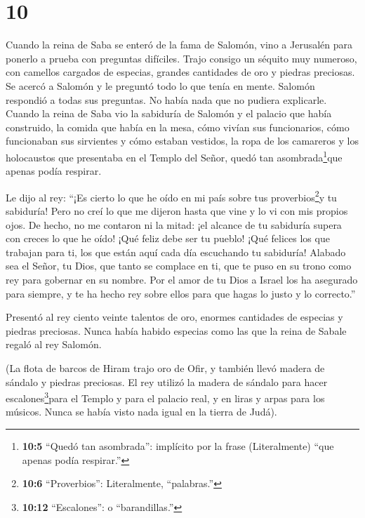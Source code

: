 \hypertarget{section-9}{%
\section{10}\label{section-9}}

 Cuando la reina de Saba se enteró de la fama de Salomón,
vino a Jerusalén para ponerlo a prueba con preguntas difíciles.
 Trajo consigo un séquito muy numeroso, con camellos
cargados de especias, grandes cantidades de oro y piedras preciosas. Se
acercó a Salomón y le preguntó todo lo que tenía en mente. 
Salomón respondió a todas sus preguntas. No había nada que no pudiera
explicarle.  Cuando la reina de Saba vio la sabiduría de
Salomón y el palacio que había construido,  la comida que
había en la mesa, cómo vivían sus funcionarios, cómo funcionaban sus
sirvientes y cómo estaban vestidos, la ropa de los camareros y los
holocaustos que presentaba en el Templo del Señor, quedó tan
asombrada\footnote{\textbf{10:5} ``Quedó tan asombrada'': implícito por
  la frase (Literalmente) ``que apenas podía respirar.''}que apenas
podía respirar.

 Le dijo al rey: ``¡Es cierto lo que he oído en mi país
sobre tus proverbios\footnote{\textbf{10:6} ``Proverbios'':
  Literalmente, ``palabras.''}y tu sabiduría!  Pero no creí
lo que me dijeron hasta que vine y lo vi con mis propios ojos. De hecho,
no me contaron ni la mitad: ¡el alcance de tu sabiduría supera con
creces lo que he oído!  ¡Qué feliz debe ser tu pueblo! ¡Qué
felices los que trabajan para ti, los que están aquí cada día escuchando
tu sabiduría!  Alabado sea el Señor, tu Dios, que tanto se
complace en ti, que te puso en su trono como rey para gobernar en su
nombre. Por el amor de tu Dios a Israel los ha asegurado para siempre, y
te ha hecho rey sobre ellos para que hagas lo justo y lo correcto.''

 Presentó al rey ciento veinte talentos de oro, enormes
cantidades de especias y piedras preciosas. Nunca había habido especias
como las que la reina de Sabale regaló al rey Salomón.

 (La flota de barcos de Hiram trajo oro de Ofir, y también
llevó madera de sándalo y piedras preciosas.  El rey
utilizó la madera de sándalo para hacer escalones\footnote{\textbf{10:12}
  ``Escalones'': o ``barandillas.''}para el Templo y para el palacio
real, y en liras y arpas para los músicos. Nunca se había visto nada
igual en la tierra de Judá).

